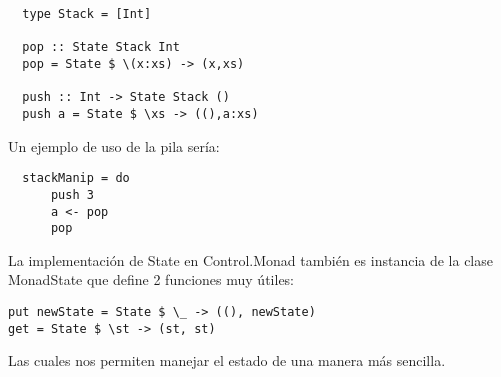 \begin{lstlisting}
  type Stack = [Int]

  pop :: State Stack Int
  pop = State $ \(x:xs) -> (x,xs)

  push :: Int -> State Stack ()
  push a = State $ \xs -> ((),a:xs)

\end{lstlisting}

Un ejemplo de uso de la pila sería:

\begin{lstlisting}
  stackManip = do
      push 3
      a <- pop
      pop
\end{lstlisting}


La implementación de State en Control.Monad también es instancia de la clase
MonadState que define 2 funciones muy útiles:

\begin{lstlisting}
put newState = State $ \_ -> ((), newState)
get = State $ \st -> (st, st)
\end{lstlisting}

Las cuales nos permiten manejar el estado de una manera más sencilla.



